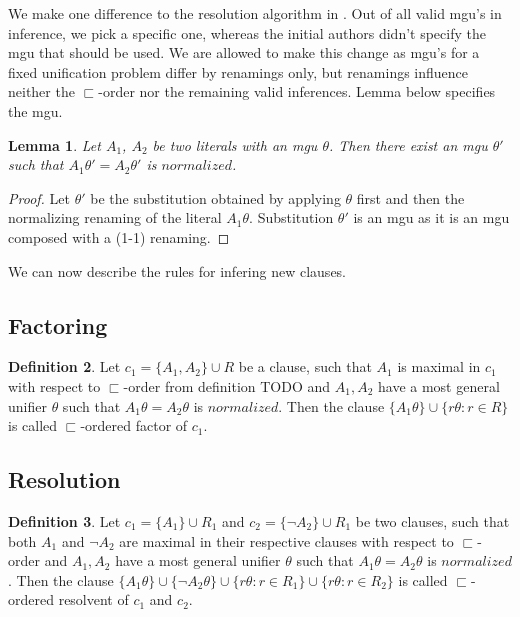 \documentclass[english, shortabstract]{iithesis}
\theoremstyle{definition} \newtheorem{definition}{Definition}[chapter]
\theoremstyle{remark} \newtheorem{remark}[definition]{Observation}
\theoremstyle{plain} \newtheorem{theorem}[definition]{Theorem}
\theoremstyle{plain} \newtheorem{lemma}[definition]{Lemma}
\begin{document}
We make one difference to the resolution algorithm in \cite{Resolution gf}.
Out of all valid mgu's in inference, we pick a specific one, whereas the initial authors didn't specify the mgu that should be used.
We are allowed to make this change as mgu's for a fixed unification problem differ by renamings only,
but renamings influence neither the $\sqsubset$-order nor the remaining valid inferences.
Lemma below specifies the mgu.
\begin{lemma}
Let $A_1$, $A_2$ be two literals with an mgu $\theta$.
Then there exist an mgu $\theta'$ such that $A_1\theta'=A_2\theta'$ is $normalized$.
\end{lemma}
\begin{proof}
Let $\theta'$ be the substitution obtained by applying $\theta$ first and then the normalizing renaming of the literal $A_1\theta$.
Substitution $\theta'$ is an mgu as it is an mgu composed with a (1-1) renaming.
\end{proof}

We can now describe the rules for infering new clauses.

\subsection{Factoring}

\begin{definition}
Let $c_1=\{A_1, A_2\} \cup R$ be a clause,
such that $A_1$ is maximal in $c_1$ with respect to $\sqsubset$-order from definition TODO
and $A_1, A_2$ have a most general unifier $\theta$ such that $A_1\theta=A_2\theta$ is $normalized$.
Then the clause $\{A_1\theta\}\cup \{r\theta : r \in R\}$ is called $\sqsubset$-ordered factor of $c_1$.
\end{definition}

\subsection{Resolution}

\begin{definition}
Let $c_1=\{A_1\} \cup R_1$ and $c_2=\{\lnot A_2\} \cup R_1$ be two clauses,
such that both $A_1$ and $\lnot A_2$ are maximal in their respective clauses with respect to $\sqsubset$-order
and $A_1, A_2$ have a most general unifier $\theta$ such that $A_1\theta=A_2\theta$ is $normalized$.
Then the clause $\{A_1\theta\}\cup \{\lnot A_2\theta\} \cup \{r\theta : r \in R_1\} \cup \{r\theta : r \in R_2\}$ is called $\sqsubset$-ordered resolvent of $c_1$ and $c_2$.
\end{definition}
\end{document}
